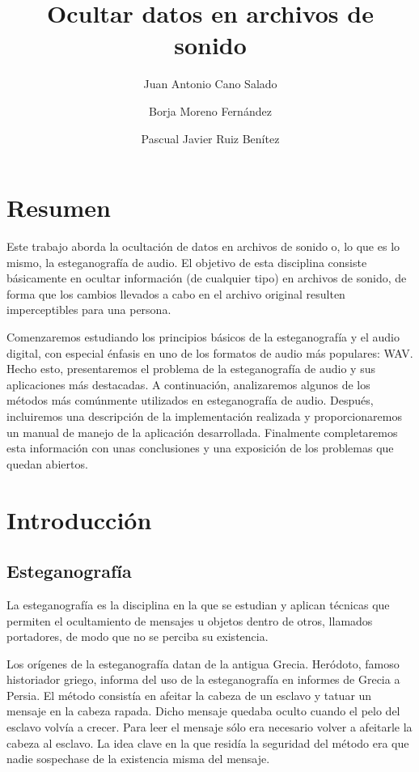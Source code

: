\documentclass[12pt]{article}
\title{Ocultar datos en archivos de sonido}
\author{Juan Antonio Cano Salado \and Borja Moreno Fernández \and Pascual Javier Ruiz Benítez}
\begin{document}
\maketitle

\newpage
\tableofcontents

\newpage
\section{Resumen}

Este trabajo aborda la ocultación de datos en archivos de sonido o, lo que es lo mismo, la esteganografía de audio. El objetivo de esta disciplina consiste básicamente en ocultar información (de cualquier tipo) en archivos de sonido, de forma que los cambios llevados a cabo en el archivo original resulten imperceptibles para una persona.

Comenzaremos estudiando los principios básicos de la esteganografía y el audio digital, con especial énfasis en uno de los formatos de audio más populares: WAV. Hecho esto, presentaremos el problema de la esteganografía de audio y sus aplicaciones más destacadas. A continuación, analizaremos algunos de los métodos más comúnmente utilizados en esteganografía de audio. Después, incluiremos una descripción de la implementación realizada y proporcionaremos un manual de manejo de la aplicación desarrollada. Finalmente completaremos esta información con unas conclusiones y una exposición de los problemas que quedan abiertos.

\newpage
\section{Introducción}

\subsection{Esteganografía}

La esteganografía es la disciplina en la que se estudian y aplican técnicas que permiten el ocultamiento de mensajes u objetos dentro de otros, llamados portadores, de modo que no se perciba su existencia.

Los orígenes de la esteganografía datan de la antigua Grecia. Heródoto, famoso historiador griego, informa del uso de la esteganografía en informes de Grecia a Persia. El método consistía en afeitar la cabeza de un esclavo y tatuar un mensaje en la cabeza rapada. Dicho mensaje quedaba oculto cuando el pelo del esclavo volvía a crecer. Para leer el mensaje sólo era necesario volver a afeitarle la cabeza al esclavo. La idea clave en la que residía la seguridad del método era que nadie sospechase de la existencia misma del mensaje.
\end{document}
